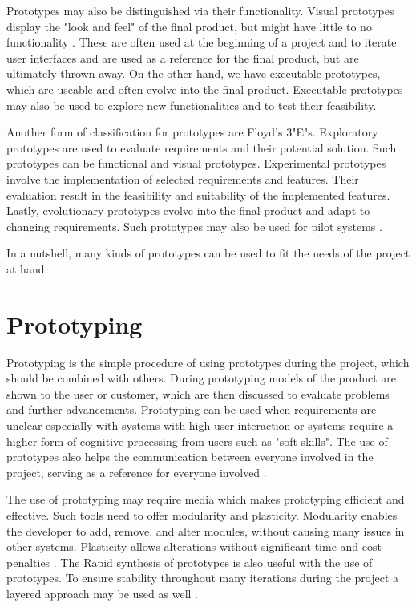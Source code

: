 \documentclass[runningheads]{llncs}
\begin{document}
Prototypes may also be distinguished via their functionality. 
Visual prototypes display the "look and feel" of the final product, but might have little 
to no functionality \cite{ref_RPInAction}. These are often used at the beginning of a project and to iterate 
user interfaces and are used as a reference for the final product, but are ultimately thrown away.
On the other hand, we have executable prototypes, which are useable and often evolve into the final product.
Executable prototypes may also be used to explore new functionalities and to test their feasibility\cite{ref_RPInAction}.

Another form of classification for prototypes are Floyd's 3"E"s.
Exploratory prototypes are used to evaluate requirements and their potential solution. Such prototypes can be functional and 
visual prototypes.
Experimental prototypes involve the implementation of selected requirements and features. Their evaluation result in the feasibility
and suitability of the implemented features.
Lastly, evolutionary prototypes evolve into the final product and adapt to changing requirements. Such prototypes may also be used for
pilot systems \cite{ref_ui}.

In a nutshell, many kinds of prototypes can be used to fit the needs of the project at hand.

\section{Prototyping}
Prototyping is the simple procedure of using prototypes during the project, which should be combined with others\cite{ref_prac}. 
During prototyping models of the product are shown to the user or customer, which are then discussed to evaluate problems 
and further advancements. Prototyping can be used when requirements are unclear especially with systems with high user interaction 
or systems require a higher form of cognitive processing from users such as "soft-skills".
The use of prototypes also helps the communication between everyone involved in the project, serving as a reference for everyone 
involved \cite{ref_RPInAction}.

The use of prototyping may require media which makes prototyping efficient and effective. Such tools need to offer modularity and plasticity.
Modularity enables the developer to add, remove, and alter modules, without causing many issues in other systems. Plasticity allows alterations
without significant time and cost penalties \cite{ref_RPalternativeStrategy}. The Rapid synthesis of prototypes is also useful with the use of 
prototypes\cite{ref_RPalternativeStrategy}. To ensure stability throughout many iterations during the project a layered approach may be 
used as well \cite{ref_health}.
\end{document}
